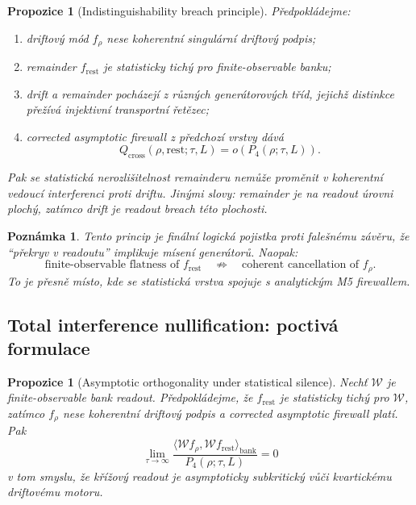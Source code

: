 \documentclass[11pt,a4paper]{article}
\newtheorem{remark}[theorem]{Poznámka}
\newtheorem{proposition}[theorem]{Propozice}
\begin{document}
\begin{proposition}[Indistinguishability breach principle]
Předpokládejme:
\begin{enumerate}[label=\textbf{(\arabic*)}]
    \item driftový mód \(f_\rho\) nese koherentní singulární driftový podpis;
    \item remainder \(f_{\mathrm{rest}}\) je statisticky tichý pro finite-observable banku;
    \item drift a remainder pocházejí z různých generátorových tříd, jejichž distinkce přežívá
    injektivní transportní řetězec;
    \item corrected asymptotic firewall z předchozí vrstvy dává
    \[
    Q_{\mathrm{cross}}(\rho,\mathrm{rest};\tau,L)=o(P_4(\rho;\tau,L)).
    \]
\end{enumerate}
Pak se statistická nerozlišitelnost remainderu nemůže proměnit v koherentní vedoucí interferenci
proti driftu. Jinými slovy: remainder je na readout úrovni plochý, zatímco drift je readout breach
této plochosti.
\end{proposition}

\begin{remark}
Tento princip je finální logická pojistka proti falešnému závěru, že ``překryv v readoutu''
implikuje mísení generátorů.
Naopak:
\[
\text{finite-observable flatness of }f_{\mathrm{rest}}
\quad\not\Rightarrow\quad
\text{coherent cancellation of }f_\rho.
\]
To je přesně místo, kde se statistická vrstva spojuje s analytickým M5 firewallem.
\end{remark}

\subsection*{Total interference nullification: poctivá formulace}

\begin{proposition}[Asymptotic orthogonality under statistical silence]
Nechť \(\mathcal W\) je finite-observable bank readout.
Předpokládejme, že \(f_{\mathrm{rest}}\) je statisticky tichý pro \(\mathcal W\), zatímco \(f_\rho\)
nese koherentní driftový podpis a corrected asymptotic firewall platí.
Pak
\[
\lim_{\tau\to\infty}
\frac{\langle \mathcal W f_\rho,\mathcal W f_{\mathrm{rest}}\rangle_{\mathrm{bank}}}
{P_4(\rho;\tau,L)}
=0
\]
v tom smyslu, že křížový readout je asymptoticky subkritický vůči kvartickému driftovému motoru.
\end{proposition}
\end{document}
